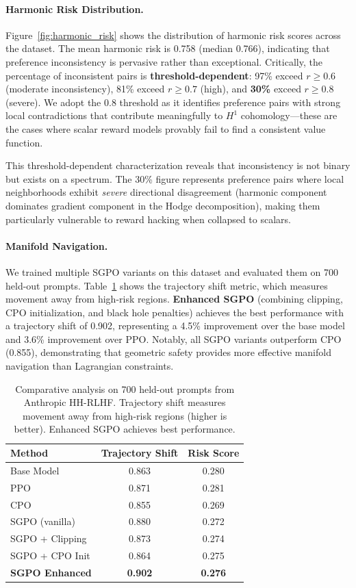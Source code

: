 \paragraph{Harmonic Risk Distribution.}
Figure~\ref{fig:harmonic_risk} shows the distribution of harmonic risk scores across the dataset. The mean harmonic risk is 0.758 (median 0.766), indicating that preference inconsistency is pervasive rather than exceptional. Critically, the percentage of inconsistent pairs is \textbf{threshold-dependent}: 97\% exceed $r \geq 0.6$ (moderate inconsistency), 81\% exceed $r \geq 0.7$ (high), and \textbf{30\%} exceed $r \geq 0.8$ (severe). We adopt the 0.8 threshold as it identifies preference pairs with strong local contradictions that contribute meaningfully to $H^1$ cohomology---these are the cases where scalar reward models provably fail to find a consistent value function.

This threshold-dependent characterization reveals that inconsistency is not binary but exists on a spectrum. The 30\% figure represents preference pairs where local neighborhoods exhibit \textit{severe} directional disagreement (harmonic component dominates gradient component in the Hodge decomposition), making them particularly vulnerable to reward hacking when collapsed to scalars.

\paragraph{Manifold Navigation.}
We trained multiple SGPO variants on this dataset and evaluated them on 700 held-out prompts. Table~\ref{tab:comparative_analysis} shows the trajectory shift metric, which measures movement away from high-risk regions. \textbf{Enhanced SGPO} (combining clipping, CPO initialization, and black hole penalties) achieves the best performance with a trajectory shift of 0.902, representing a 4.5\% improvement over the base model and 3.6\% improvement over PPO. Notably, all SGPO variants outperform CPO (0.855), demonstrating that geometric safety provides more effective manifold navigation than Lagrangian constraints.

\begin{table}[t]
\centering
\small
\caption{Comparative analysis on 700 held-out prompts from Anthropic HH-RLHF. Trajectory shift measures movement away from high-risk regions (higher is better). Enhanced SGPO achieves best performance.}
\label{tab:comparative_analysis}
\begin{tabular}{@{}lcc@{}}
\toprule
\textbf{Method} & \textbf{Trajectory Shift} & \textbf{Risk Score} \\
\midrule
Base Model & 0.863 & 0.280 \\
PPO & 0.871 & 0.281 \\
CPO & 0.855 & 0.269 \\
SGPO (vanilla) & 0.880 & 0.272 \\
SGPO + Clipping & 0.873 & 0.274 \\
SGPO + CPO Init & 0.864 & 0.275 \\
\textbf{SGPO Enhanced} & \textbf{0.902} & \textbf{0.276} \\
\bottomrule
\end{tabular}
\end{table}

